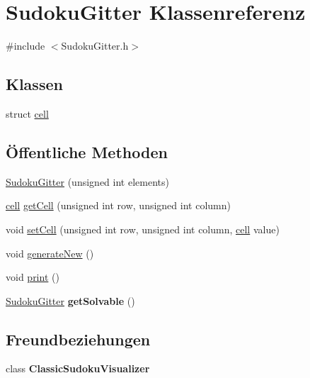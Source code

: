 \hypertarget{class_sudoku_gitter}{\section{Sudoku\-Gitter Klassenreferenz}
\label{class_sudoku_gitter}
}


{\ttfamily \#include $<$Sudoku\-Gitter.\-h$>$}

\subsection*{Klassen}
\begin{DoxyCompactItemize}
\item 
struct \hyperlink{struct_sudoku_gitter_1_1cell}{cell}
\end{DoxyCompactItemize}
\subsection*{Öffentliche Methoden}
\begin{DoxyCompactItemize}
\item 
\hyperlink{class_sudoku_gitter_ad3443d5846cba4cef8fdfebc46f16c0b}{Sudoku\-Gitter} (unsigned int elements)
\item 
\hyperlink{struct_sudoku_gitter_1_1cell}{cell} \hyperlink{class_sudoku_gitter_afe38684eb8b3d8b7d4d720dd462173c0}{get\-Cell} (unsigned int row, unsigned int column)
\item 
void \hyperlink{class_sudoku_gitter_af096bfe6c7b8299f33f885ab69d76217}{set\-Cell} (unsigned int row, unsigned int column, \hyperlink{struct_sudoku_gitter_1_1cell}{cell} value)
\item 
void \hyperlink{class_sudoku_gitter_a1cd2a95fea6f56d295fcc4bb11412c2e}{generate\-New} ()
\item 
void \hyperlink{class_sudoku_gitter_a771332a8a5eff5e1917538adfb237d0e}{print} ()
\item 
\hypertarget{class_sudoku_gitter_ad089a50f3435a3eb025aacab74b8fbed}{\hyperlink{class_sudoku_gitter}{Sudoku\-Gitter} {\bfseries get\-Solvable} ()}\label{class_sudoku_gitter_ad089a50f3435a3eb025aacab74b8fbed}

\end{DoxyCompactItemize}
\subsection*{Freundbeziehungen}
\begin{DoxyCompactItemize}
\item 
\hypertarget{class_sudoku_gitter_a3f8b3753aa8e1441912c8724f574e730}{class {\bfseries Classic\-Sudoku\-Visualizer}}\label{class_sudoku_gitter_a3f8b3753aa8e1441912c8724f574e730}

\end{DoxyCompactItemize}


